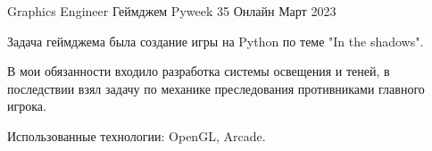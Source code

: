 

\begin{cventries}

  \cventry
  {Graphics Engineer} %
  {Геймджем Pyweek 35} %
  {Онлайн} %
  {Март 2023} %
  {
    \begin{cvitems} %
      \item {Задача геймджема была создание игры на Python по теме "In the shadows". }
      \item {В мои обязанности входило разработка системы освещения и теней, в последствии взял задачу по механике преследования противниками главного игрока. }
      \item {Использованные технологии: OpenGL, Arcade. }
    \end{cvitems}
  }


\end{cventries}
